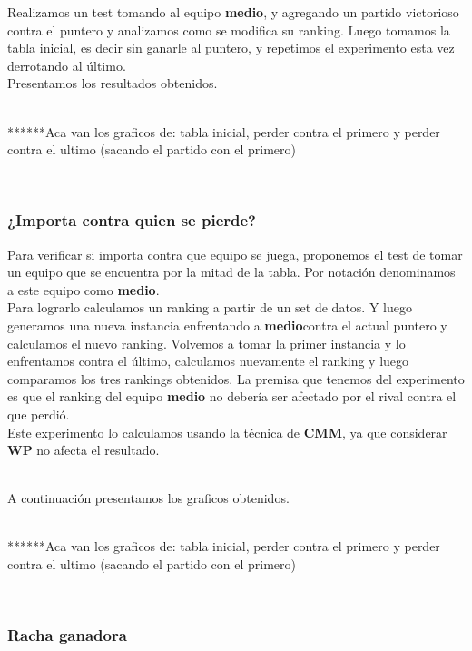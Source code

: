 Realizamos un test tomando al equipo \textbf{medio}, y agregando un partido victorioso contra el puntero y analizamos como se modifica su ranking. Luego tomamos la tabla inicial, es decir sin ganarle al puntero, y repetimos el experimento esta vez derrotando al último. \\

Presentamos los resultados obtenidos.

\\


******Aca van los graficos de: tabla inicial, perder contra el primero y perder contra el ultimo (sacando el partido con el primero)

\\




\subsubsection{¿Importa contra quien se pierde?}

Para verificar si importa contra que equipo se juega, proponemos el test de tomar un equipo que se encuentra por la mitad de la tabla. Por notación denominamos a este equipo como \textbf{medio}. \\

Para lograrlo calculamos un ranking a partir de un set de datos. Y luego generamos una nueva instancia enfrentando a \textbf{medio}contra el actual puntero y calculamos el nuevo ranking. Volvemos a tomar la primer instancia y lo enfrentamos contra el último, calculamos nuevamente el ranking y luego comparamos los tres rankings obtenidos. La premisa que tenemos del experimento es que el ranking del equipo \textbf{medio} no debería ser afectado por el rival contra el que perdió.\\

Este experimento lo calculamos usando la técnica de \textbf{CMM}, ya que considerar \textbf{WP} no afecta el resultado.

\\
A continuación presentamos los graficos obtenidos.

\\


******Aca van los graficos de: tabla inicial, perder contra el primero y perder contra el ultimo (sacando el partido con el primero)

\\



\subsubsection{Racha ganadora}

